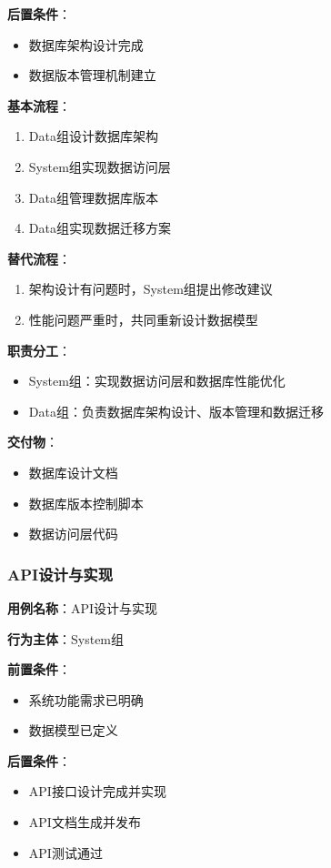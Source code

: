 \documentclass[a4paper,12pt]{article}
\begin{document}
\textbf{后置条件}：
\begin{itemize}
  \item 数据库架构设计完成
  \item 数据版本管理机制建立
\end{itemize}

\textbf{基本流程}：
\begin{enumerate}
  \item Data组设计数据库架构
  \item System组实现数据访问层
  \item Data组管理数据库版本
  \item Data组实现数据迁移方案
\end{enumerate}

\textbf{替代流程}：
\begin{enumerate}
  \item 架构设计有问题时，System组提出修改建议
  \item 性能问题严重时，共同重新设计数据模型
\end{enumerate}

\textbf{职责分工}：
\begin{itemize}
  \item System组：实现数据访问层和数据库性能优化
  \item Data组：负责数据库架构设计、版本管理和数据迁移
\end{itemize}

\textbf{交付物}：
\begin{itemize}
  \item 数据库设计文档
  \item 数据库版本控制脚本
  \item 数据访问层代码
\end{itemize}

\subsubsection{API设计与实现}

\textbf{用例名称}：API设计与实现

\textbf{行为主体}：System组

\textbf{前置条件}：
\begin{itemize}
  \item 系统功能需求已明确
  \item 数据模型已定义
\end{itemize}

\textbf{后置条件}：
\begin{itemize}
  \item API接口设计完成并实现
  \item API文档生成并发布
  \item API测试通过
\end{itemize}
\end{document}
